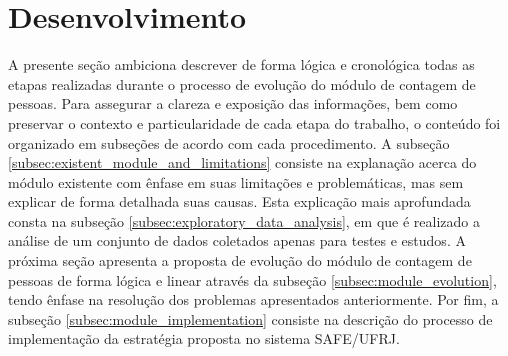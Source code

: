 \section{Desenvolvimento}
\label{sec:metodologia}

A presente seção ambiciona descrever de forma lógica e cronológica todas as etapas realizadas durante o processo de evolução do módulo de contagem de pessoas. Para assegurar a clareza e exposição das informações, bem como preservar o contexto e particularidade de cada etapa do trabalho, o conteúdo foi organizado em subseções de acordo com cada procedimento. A subseção \ref{subsec:existent_module_and_limitations} consiste na explanação acerca do módulo existente com ênfase em suas limitações e problemáticas, mas sem explicar de forma detalhada suas causas. Esta explicação mais aprofundada consta na subseção \ref{subsec:exploratory_data_analysis}, em que é realizado a análise de um conjunto de dados coletados apenas para testes e estudos. A próxima seção apresenta a proposta de evolução do módulo de contagem de pessoas de forma lógica e linear através da subseção \ref{subsec:module_evolution}, tendo ênfase na resolução dos problemas apresentados anteriormente. Por fim, a subseção \ref{subsec:module_implementation} consiste na descrição do processo de implementação da estratégia proposta no sistema SAFE/UFRJ.  








